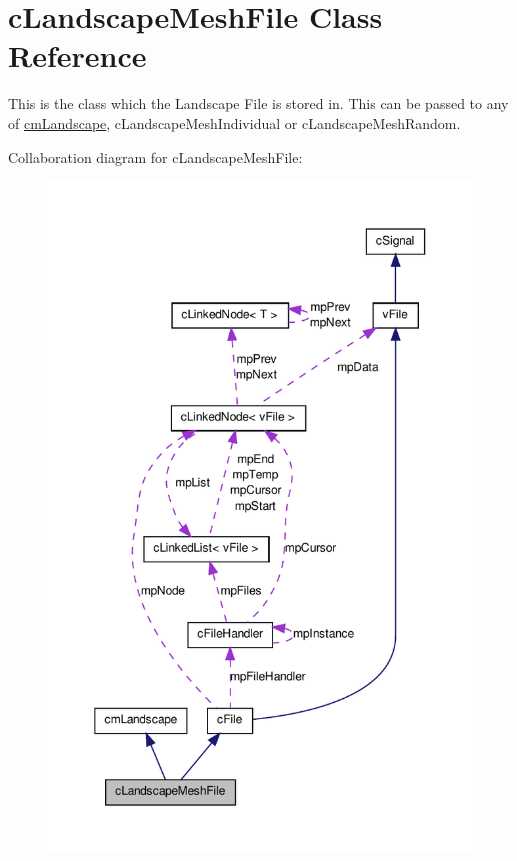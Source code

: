 \hypertarget{classc_landscape_mesh_file}{
\section{cLandscapeMeshFile Class Reference}
\label{classc_landscape_mesh_file}
}


This is the class which the Landscape File is stored in. This can be passed to any of \hyperlink{classcm_landscape}{cmLandscape}, cLandscapeMeshIndividual or cLandscapeMeshRandom.  




Collaboration diagram for cLandscapeMeshFile:\nopagebreak
\begin{figure}[H]
\begin{center}
\leavevmode
\includegraphics[width=356pt]{classc_landscape_mesh_file__coll__graph}
\end{center}
\end{figure}

